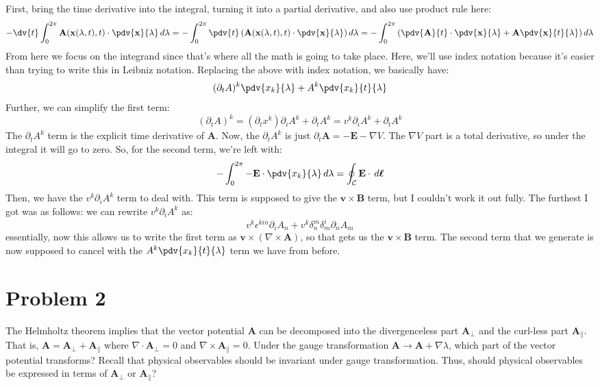 \documentclass[10pt]{article}
\begin{document}
	\begin{solution}
		 First, bring the time derivative into the integral, turning it into a partial derivative, and also
		 use product rule here:
		 \[
			 -\dv{t} \int_{0}^{2\pi} \mathbf{A}(\mathbf{x}(\lambda, t), t) \cdot \pdv{\mathbf{x}}{\lambda}
			 \diff \lambda = -\int_{0}^{2\pi} \pdv{t} \left( \mathbf{A}(\mathbf{x}(\lambda, t), t) \cdot
			 \pdv{\mathbf{x}}{\lambda} \right) d \lambda = -\int_{0}^{2\pi} \left(\pdv{\mathbf{A}}{t} \cdot
		 \pdv{\mathbf{x}}{\lambda} + \mathbf{A} \pdv{\mathbf{x}}{t}{\lambda} \right)d\lambda
		 \]
		 From here we focus on the integrand since that's where all the math is going to take place. Here,
		 we'll use index notation because it's easier than trying to write this in Leibniz notation.
		 Replacing the above with index notation, we basically have:
		 \[
			 (\partial_t A)^{k} \pdv{x_k}{\lambda} + A^{k} \pdv{x_k}{t}{\lambda}
		 \]
		 Further, we can simplify the first term:
		 \[
			 (\partial_t A)^{k} = (\partial_t x^{k}) \partial_i A^{k} + \partial_t A^{k} = v^{k}\partial_i
			 A^{k} + \partial_t A^{k}	
		 \]
		 The \( \partial_t A^{k} \) term is the explicit time derivative of \( \mathbf{A} \). Now, the \(
		 \partial_t A^{k} \) is just \( \partial_t \mathbf{A} = -\mathbf{E} - \nabla V \). The 
		 \( \nabla V \) part is a total derivative, so under the integral it will go to zero. So, for the
		 second term, we're left with:
		 \[
			 -\int_{0}^{2\pi}
			 - \mathbf{E}\cdot  \pdv{x_k}{\lambda} \diff \lambda = \oint_{\mathcal{C}}\mathbf{E} \cdot \diff
			 \boldsymbol{\ell}
		 \]
		 Then, we have the \( v^{k}\partial_i A^{k} \) term to deal with. This term is supposed to give the
		 \( \mathbf{v} \times \mathbf{B} \) term, but I couldn't work it out fully. The furthest I got was as
		 follows: we can rewrite \( v^{k}\partial_i A^{k} \) as:
		 \[
		 	v^{k}\epsilon^{kin} \partial_i A_n + v^{k}\delta_n^{m}\delta_m^{i} \partial_n A_m
		 \]
		 essentially, now this allows us to write the first term as \( \mathbf{v} \times (\nabla \times \mathbf{A})
		 \), so that gets us the \( \mathbf{v} \times \mathbf{B} \) term. The second term that we generate is
		 now supposed to cancel with the \( A^{k}\pdv{x_k}{t}{\lambda} \) term we have from before.  
	 \end{solution}
	\pagebreak
	\section*{Problem 2}
	The Helmholtz theorem implies that the vector potential \( \mathbf{A} \) can be decomposed into the
	divergenceless part \( \mathbf{A}_{\perp} \) and the curl-less part \( \mathbf{A}_{\parallel} \). That
	is, \( \mathbf{A} = \mathbf{A}_{\perp} + \mathbf{A}_{\parallel} \) where \( \nabla \cdot
	\mathbf{A}_{\perp} = 0 \) and \( \nabla \times \mathbf{A}_{\parallel} = 0 \). Under the gauge
	transformation \( \mathbf{A} \to \mathbf{A} + \nabla \lambda \), which part of the vector potential
	transforms? Recall that physical observables should be invariant under gauge transformation. Thus, should
	physical observables be expressed in terms of \( \mathbf{A}_{\perp} \) or \( \mathbf{A}_{\parallel} \)? 
\end{document}

